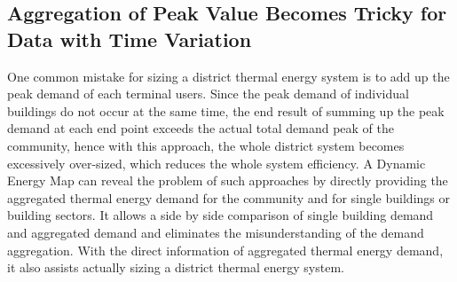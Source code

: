 \subsection{Aggregation of Peak Value Becomes Tricky for Data with
  Time Variation}
One common mistake for sizing a district thermal energy system is to
add up the peak demand of each terminal users. Since the peak demand
of individual buildings do not occur at the same time, the end result
of summing up the peak demand at each end point exceeds the actual
total demand peak of the community, hence with this approach, the
whole district system becomes excessively over-sized, which reduces
the whole system efficiency. A Dynamic Energy Map can reveal the
problem of such approaches by directly providing the aggregated
thermal energy demand for the community and for single buildings or
building sectors. It allows a side by side comparison of single
building demand and aggregated demand and eliminates the
misunderstanding of the demand aggregation. With the direct
information of aggregated thermal energy demand, it also assists
actually sizing a district thermal energy system.